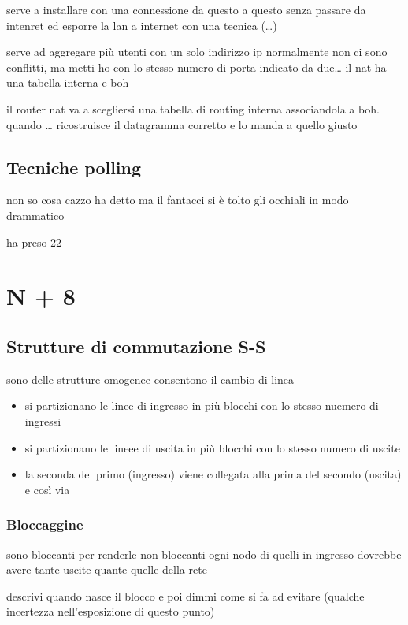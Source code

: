 \documentclass[11pt]{article}
\begin{document}
serve a installare con una connessione da questo a questo senza passare da intenret
ed esporre la lan a internet con una tecnica (\ldots{})

serve ad aggregare più utenti con un solo indirizzo ip
normalmente non ci sono conflitti, ma metti ho con lo stesso numero di porta indicato da due\ldots{}
il nat ha una tabella interna e boh

il router nat va a scegliersi una tabella di routing interna associandola a boh.
quando \ldots{} ricostruisce il datagramma corretto e lo manda a quello giusto

\subsection{Tecniche polling}
\label{sec:org786b671}
non so cosa cazzo ha detto ma il fantacci si è tolto gli occhiali in modo drammatico

ha preso 22

\section{N + 8}
\label{sec:org2a92b68}
\subsection{Strutture di commutazione S-S}
\label{sec:org674ee2f}
sono delle strutture omogenee
consentono il cambio di linea
\begin{itemize}
\item si partizionano le linee di ingresso in più blocchi con lo stesso nuemero di ingressi
\item si partizionano le lineee di uscita in più blocchi con lo stesso numero di uscite

\item la seconda del primo (ingresso) viene collegata alla prima del secondo (uscita) e così via
\end{itemize}

\subsubsection{Bloccaggine}
\label{sec:orgde06ba4}
sono bloccanti
per renderle non bloccanti ogni nodo di quelli in ingresso dovrebbe avere tante uscite quante quelle della rete

descrivi quando nasce il blocco e poi dimmi come si fa ad evitare
(qualche incertezza nell'esposizione di questo punto)
\end{document}
